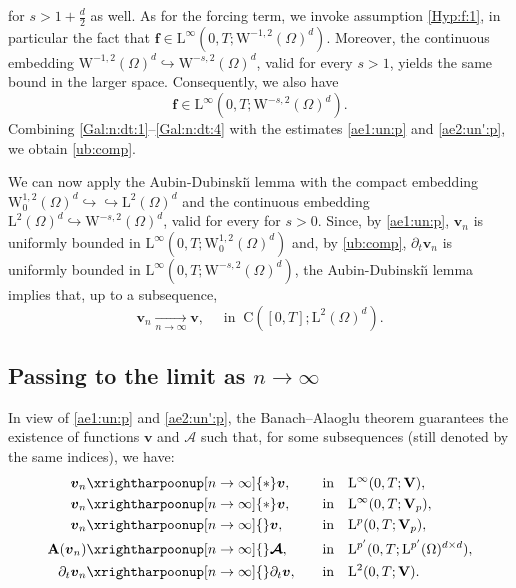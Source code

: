 \documentclass[12pt,reqno]{amsart}
\numberwithin{equation}{section}
\theoremstyle{definition}
\def\1{\Omega}
\def\W{\mathrm{W}}
\def\L{\mathrm{L}}
\def\vv{\boldsymbol{v}}
\def\f{\boldsymbol{f}}
\def\C{\mathrm{C}}
\def\bfV{\mathbf{V}}
\def\bfA{\mathbf{A}}
\def\bmcA{\boldsymbol{\mathcal{A}}}
\begin{document}
for  $s>1+\frac{d}{2}$ as well.
As for the forcing term, we invoke assumption \eqref{Hyp:f:1}, in particular the fact that $\f \in \L^{\infty}(0,T;\W^{-1,2}(\Omega)^d)$. Moreover, the continuous embedding $\W^{-1,2}(\Omega)^d \hookrightarrow \W^{-s,2}(\Omega)^d$, valid for every $s>1$, yields the same bound in the larger space. Consequently, we also have
\begin{equation}\label{Gal:n:dt:4}
\f \in \L^{\infty}(0,T;\W^{-s,2}(\Omega)^d).
\end{equation}
Combining \eqref{Gal:n:dt:1}--\eqref{Gal:n:dt:4} with the estimates \eqref{ae1:un:p} and \eqref{ae2:un':p}, we obtain \eqref{ub:comp}.

We can now apply the Aubin-Dubinski\u{\i} lemma with the compact embedding
$\W^{1,2}_0(\Omega)^d \hookrightarrow\hookrightarrow \L^2(\Omega)^d$
and the continuous embedding
$\L^2(\Omega)^d \hookrightarrow \W^{-s,2}(\Omega)^d$, valid for every for $s>0$.
Since, by \eqref{ae1:un:p}, $\vv_n$ is uniformly bounded in
$\L^\infty(0,T;\W^{1,2}_0(\Omega)^d)$ and, by \eqref{ub:comp},
$\partial_t \vv_n$ is uniformly bounded in
$\L^\infty(0,T;\W^{-s,2}(\Omega)^d)$, the Aubin-Dubinski\u{\i} lemma implies that,
up to a subsequence,
\begin{equation}\label{str:con:C0T}
\vv_n \xrightarrow[n\to\infty]{} \vv,\quad \text{ in }\ \C([0,T];\L^2(\Omega)^d).
\end{equation}

\subsection{Passing to the limit as $n\to\infty$}\label{WC}
		In view of \eqref{ae1:un:p} and \eqref{ae2:un':p}, the Banach--Alaoglu theorem guarantees the existence of functions $\vv$ and $\bmcA$ such that, for some subsequences (still denoted by the same indices), we have:
\begin{alignat}{2}
	\label{5.10:p}
	\vv_n &\xrightharpoonup[n\to\infty]{\ast} \vv, \quad && \text{in} \quad \L^\infty(0,T;\bfV), \\
	\label{5.10:1:p}
	\vv_n &\xrightharpoonup[n\to\infty]{\ast} \vv, \quad && \text{in} \quad \L^\infty(0,T;\bfV_p), \\
	\label{5.11:p}
	\vv_n &\xrightharpoonup[n\to\infty]{} \vv, \quad && \text{in} \quad \L^{p}(0,T;\bfV_p), \\
	\label{5.012:p}
	\bfA(\vv_n) &\xrightharpoonup[n\to\infty]{} \bmcA, \quad && \text{in} \quad \L^{p'}(0,T;\L^{p'}(\1)^{d \times d}), \\
	\label{5.14:p}
	\partial_t \vv_n &\xrightharpoonup[n\to\infty]{} \partial_t \vv, \quad && \text{in} \quad \L^2(0,T;\bfV).
\end{alignat}
\end{document}
